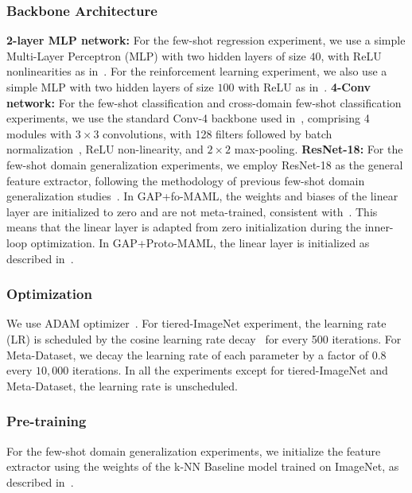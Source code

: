 \subsubsection{Backbone Architecture}
\label{sec:5.1.2}
\textbf{2-layer MLP network:}
For the few-shot regression experiment, we use a simple Multi-Layer Perceptron (MLP) with two hidden layers of size $40$, with ReLU  nonlinearities as in~\cite{finn2017model}. For the reinforcement learning experiment, we also use a simple MLP with two hidden layers of size $100$ with ReLU as in~\cite{finn2017model}.
\newline
\textbf{4-Conv network:}
For the few-shot classification and cross-domain few-shot classification experiments, we use the standard Conv-4 backbone used in~\cite{vinyals2016matching}, comprising 4 modules with $3 \times 3$ convolutions, with 128 filters followed by batch normalization~\cite{ioffe2015batch}, ReLU non-linearity, and $2 \times 2$ max-pooling.
\newline
\textbf{ResNet-18:}
For the few-shot domain generalization experiments, we employ ResNet-18 as the general feature extractor, following the methodology of previous few-shot domain generalization studies~\cite{triantafillou2019meta, baik2023learning}. 
In GAP+fo-MAML, the weights and biases of the linear layer are initialized to zero and are not meta-trained, consistent with~\cite{triantafillou2019meta}. This means that the linear layer is adapted from zero initialization during the inner-loop optimization. 
In GAP+Proto-MAML, the linear layer is initialized as described in~\cite{triantafillou2019meta}.

\subsubsection{Optimization}
We use ADAM optimizer~\cite{kingma2014adam}. 
For tiered-ImageNet experiment, the learning rate (LR) is scheduled by the cosine learning rate decay~\cite{loshchilov2016sgdr} for every 500 iterations. 
For Meta-Dataset, we decay the learning rate of each parameter by a factor of $0.8$ every $10,000$ iterations. In all the experiments except for tiered-ImageNet and Meta-Dataset, the learning rate is unscheduled.

\subsubsection{Pre-training}
For the few-shot domain generalization experiments, we initialize the feature extractor using the weights of the k-NN Baseline model trained on ImageNet, as described in~\cite{triantafillou2019meta}.


